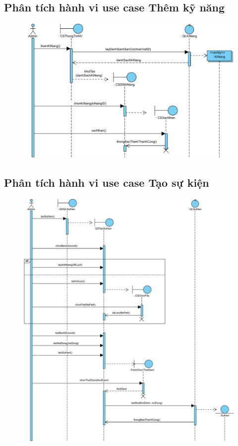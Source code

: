 \documentclass[3p]{elsarticle}
\begin{document}
\subsection{Phân tích hành vi use case Thêm kỹ năng}
\begin{figure}[!htbp]
	\hspace*{-.5in}
	\centering
	\includegraphics[scale=.55]{images/sequence-pdfs/admin/addSkill.pdf}
\end{figure}
\newpage

\subsection{Phân tích hành vi use case Tạo sự kiện}
\begin{figure}[!htbp]
	\hspace*{-.5in}
	\centering
	\includegraphics[scale=.55]{images/sequence-pdfs/admin/createEvent.pdf}
\end{figure}
\newpage
\end{document}
